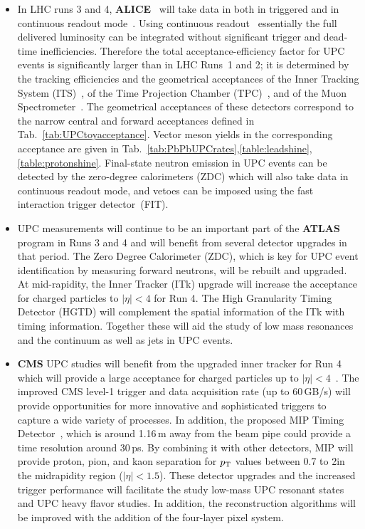 \documentclass[../report.tex]{subfiles}
\begin{document}
\begin{itemize}
\item In LHC runs 3 and 4, \textbf{ALICE}~\cite{Abelevetal:2014cna} will take data in
both in triggered and in continuous readout mode~\cite{Buncic:2015ari}. Using continuous
readout~\cite{Antoniolietal:2013} essentially the full delivered luminosity can be integrated
without significant trigger and dead-time inefficiencies. Therefore the total acceptance-efficiency factor for UPC events is significantly larger
than in LHC Runs~1 and 2; it is determined by the tracking 
efficiencies and the geometrical acceptances of the Inner Tracking
System (ITS)~\cite{Abelevetal:2014dna}, of the Time Projection Chamber (TPC)~\cite{ALICE:2014qrd}, and of the Muon Spectrometer~\cite{Uras:2012af}. The geometrical acceptances of these detectors correspond to the narrow central and forward acceptances defined in Tab.~\ref{tab:UPCtoyacceptance}. Vector meson yields in the corresponding acceptance are given in Tab.~\ref{tab:PbPbUPCrates},\ref{table:leadshine},\ref{table:protonshine}.
Final-state neutron emission in UPC events can be detected by the
zero-degree calorimeters (ZDC) which will also take data in continuous
readout mode, and vetoes can be imposed using the fast interaction
trigger detector~(FIT). %
\item UPC measurements will continue to be an important part of the \textbf{ATLAS} program in Runs 3 and 4 and will benefit from several detector upgrades in that period.  The Zero Degree Calorimeter (ZDC), which is key for UPC event identification by measuring forward neutrons, will be rebuilt and upgraded.  At mid-rapidity, the Inner Tracker (ITk) upgrade \cite{ATL-PHYS-PUB-2016-025} will increase the acceptance for charged particles to $|\eta|<4$ for Run 4.   The High Granularity Timing Detector (HGTD)  \cite{Collaboration:2623663} will complement the spatial information of the ITk with timing information.  Together these will aid the study of low mass resonances and the continuum as well as jets in UPC events.   
\item \textbf{CMS} UPC studies will benefit from the upgraded inner tracker for Run 4 which will provide a large acceptance for charged particles up to $|\eta|<4$~\cite{CMS-TDR-15-02}. The improved CMS level-1 trigger and data acquisition rate (up to 60\,\unit{GB/s}) will provide opportunities for more innovative and sophisticated triggers to capture a wide variety of processes. In addition, the proposed MIP Timing Detector~\cite{Collaboration:2296612}, which is around 1.16\,\unit{m} away from the beam pipe could provide a time resolution around 30\,\unit{ps}. By combining it with other detectors, MIP will provide proton, pion, and kaon separation for $p\sb{\scriptstyle\mathrm{T}}$ values between 0.7 to 2\UGeVc in the midrapidity region ($|\eta|<1.5$). These detector upgrades and the increased trigger performance will facilitate the study low-mass UPC resonant states and UPC heavy flavor studies. In addition, the reconstruction algorithms will be improved with the addition of the four-layer pixel system. 

\end{itemize}
\end{document}
